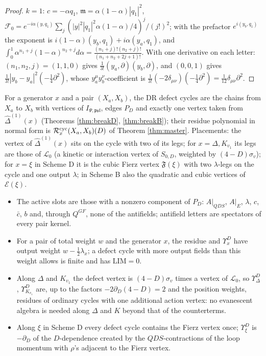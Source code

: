 \begin{proof}
$k=1$: $c=-\alpha q_1$, $\mathfrak m=\alpha(1-\alpha)|q_1|^2$, $\mathcal F_0=e^{-i\alpha(y,q_1)}\sum_j(|y|^2|q_1|^2\alpha(1-\alpha)/4)^j/(j!)^2$; with the prefactor $e^{i(y_b,q_1)}$ the exponent is $i(1-\alpha)(y_b,q_1)+i\alpha(y_a,q_1)$, and $\int_0^1\alpha^{n_1+j}(1-\alpha)^{n_2+j}d\alpha=\frac{(n_1+j)!(n_2+j)!}{(n_1+n_2+2j+1)!}$. With one derivative on each letter: $(n_1,n_2,j)=(1,1,0)$ gives $\frac1{3!}(y_a,\partial)(y_b,\partial)$, and $(0,0,1)$ gives $\frac1{3!}|y_b-y_a|^2(-\frac14\partial^2)$, whose $y_a^\mu y_b^\nu$-coefficient is $\frac1{3!}(-2\delta_{\mu\nu})(-\frac14\partial^2)=\frac1{12}\delta_{\mu\nu}\partial^2$.
\end{proof}

\begin{definition}
\label{def:defcyc}
For a generator $x$ and a pair $(X_a,X_b)$, the DR defect cycles are the chains from $X_a$ to $X_b$ with vertices of $I_{\Psi,\mathfrak{psl}}$, edges $P_D$ and exactly one vertex taken from $\widehat\Delta^{(1)}(x)$ (Theorems \ref{thm:breakD}, \ref{thm:breakB}); their residue polynomial in normal form is $\mathcal R^{\rm cyc}_x(X_a,X_b)(D)$ of Theorem \ref{thm:master}. Placements: the vertex of $\widehat\Delta^{(1)}(x)$ sits on the cycle with two of its legs; for $x=\Delta,K_{v_1}$ its legs are those of $\mathscr L_0$ (a kinetic or interaction vertex of $S_{0,D}$, weighted by $(4-D)\sigma_v$); for $x=\xi$ in Scheme D it is the cubic Fierz vertex $\mathfrak F(\xi)$ with two $\lambda$-legs on the cycle and one output $\lambda$; in Scheme B also the quadratic and cubic vertices of $\mathcal E(\xi)$.
\end{definition}

\begin{proposition}
\label{prop:active}
\mbox{}\begin{itemize}
\item[(i)] The active slots are those with a nonzero component of $P_D$: $A|_{QDS}$, $A|_E$, $\lambda$, $c$, $\bar c$, $b$ and, through $Q^{GF}$, none of the antifields; antifield letters are spectators of every pair kernel.
\item[(ii)] For a pair of total weight $w$ and the generator $x$, the residue and $\Upsilon^D_x$ have output weight $w-\frac12\lambda_x$; a defect cycle with more output fields than this weight allows is finite and has $\mathrm{LIM}=0$.
\item[(iii)] Along $\Delta$ and $K_{v_1}$ the defect vertex is $(4-D)\sigma_v$ times a vertex of $\mathscr L_0$, so $\Upsilon^D_\Delta$, $\Upsilon^D_{K_{v_1}}$ are, up to the factors $-2\partial_D(4-D)=2$ and the position weights, residues of ordinary cycles with one additional action vertex: no evanescent algebra is needed along $\Delta$ and $K$ beyond that of the counterterms.
\item[(iv)] Along $\xi$ in Scheme D every defect cycle contains the Fierz vertex once; $\Upsilon^D_\xi$ is $-\partial_D$ of the $D$-dependence created by the $QDS$-contractions of the loop momentum with $\rho$'s adjacent to the Fierz vertex.
\end{itemize}
\end{proposition}

